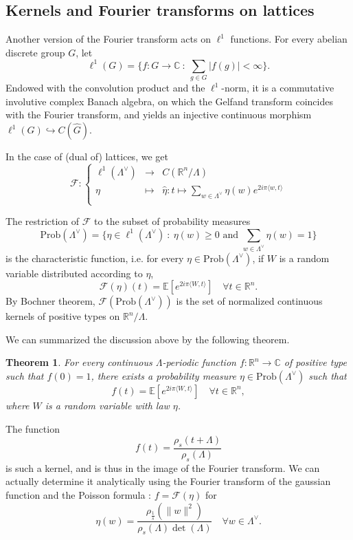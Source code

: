 \documentclass{article}
\newtheorem{theorem}{Theorem}
\begin{document}
\subsection{Kernels and Fourier transforms on lattices}

Another version of the Fourier transform acts on $\ell^1$ functions. For every abelian discrete group $G$, let 
\[\ell^1(G) = \{ f : G \rightarrow \mathbb C \ :\ \sum_{g\in G}|f(g)| < \infty \}.\]
Endowed with the convolution product and the $\ell^1$-norm, it is a commutative involutive complex Banach algebra, on which the Gelfand transform coincides with the Fourier transform, and yields an injective continuous morphism $\ell^1(G)\hookrightarrow C(\hat G)$. 

In the case of (dual of) lattices, we get
\[\mathcal F : \left\{ \begin{array}{rcl}
\ell^1(\Lambda^\vee) & \rightarrow &  C(\mathbb R^n / \Lambda) \\
\eta & \mapsto & \hat \eta : t \mapsto \sum_{w\in \Lambda^\vee} \eta(w) e^{2i\pi \langle w , t\rangle} \\ 
\end{array}\right.\]

The restriction of $\mathcal F$ to the subset of probability measures
\[\text{Prob}(\Lambda^\vee) =\{\eta\in\ell^1(\Lambda^\vee) \ :\ \eta(w)\geq 0 \text{ and } \sum_{w\in \Lambda^\vee} \eta(w) = 1\}  \]
is the characteristic function, i.e. for every $\eta\in\text{Prob} (\Lambda^\vee)$, if $W$ is a random variable distributed according to $\eta$, 
\[\mathcal F(\eta)(t) = \mathbb E[e^{2i\pi \langle W , t\rangle } ]\quad\forall t\in \mathbb R^n.\] 
By Bochner theorem, $\mathcal F(\text{Prob} (\Lambda^\vee))$ is the set of normalized continuous kernels of positive types on $\mathbb R^n / \Lambda$.

We can summarized the discussion above by the following theorem.

\begin{theorem}
For every continuous $\Lambda$-periodic function $f : \mathbb R^n \rightarrow \mathbb C$ of positive type such that $f(0) = 1$, there exists a probability measure $\eta\in \text{Prob} (\Lambda^\vee)$ such that 
\[f(t) =\mathbb E[e^{2i\pi \langle W , t\rangle } ]\quad\forall t\in \mathbb R^n ,\]
where $W$ is a random variable with law $\eta$.
\end{theorem}

The function 
\[f(t) = \frac{\rho_s(t+\Lambda)}{\rho_s(\Lambda)}\]
is such a kernel, and is thus in the image of the Fourier transform. We can actually determine it analytically using the Fourier transform of the gaussian function and the Poisson formula : $f = \mathcal F(\eta) $ for 
\[\eta(w) = \frac{\rho_{\frac{1}{s}} (\|w\|^2)}{\rho_s(\Lambda) \det(\Lambda)} \quad\forall w\in \Lambda^\vee.\] 
\end{document}
